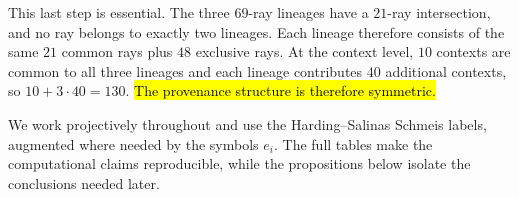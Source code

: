 \documentclass[%
  reprint,
  superscriptaddress,
  showpacs,
  showkeys,
  amsmath,amssymb,
  pra,
  longbibliography,
  floatfix,
  x11names
]{revtex4-2}
\newenvironment{revision}{\begingroup\color{revisionblue}}{\endgroup}
\newcommand{\corr}[1]{{\color{red}\hl{#1}}}
\begin{document}
\begin{revision}
This last step is essential.  The three $69$-ray lineages have a $21$-ray intersection, and no ray belongs to exactly two lineages.  Each lineage therefore consists of the same $21$ common rays plus $48$ exclusive rays.  At the context level, $10$ contexts are common to all three lineages and each lineage contributes $40$ additional contexts, so $10+3\cdot40=130$.  \corr{The provenance structure is therefore symmetric.}

We work projectively throughout and use the Harding--Salinas Schmeis labels, augmented where needed by the symbols $e_i$.  The full tables make the computational claims reproducible, while the propositions below isolate the conclusions needed later.
\end{revision}



\begin{figure}[ht]
\centering
{}
\end{figure}
\end{document}
